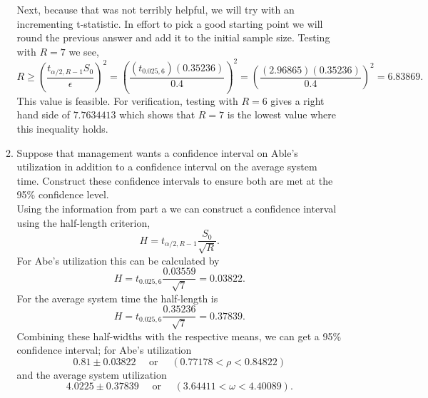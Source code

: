 \documentclass[12pt]{amsart}
\begin{document}
\begin{enumerate}[1.]
\begin{enumerate}
	Next, because that was not terribly helpful, we will try with an incrementing t-statistic. 
	In effort to pick a good starting point we will round the previous answer and add it to the initial sample size.
	Testing with \(R=7\) we see,
	\[R \geq \left(\frac{t_{\alpha/2,R-1}S_0}{\epsilon}\right)^2 
	= \left(\frac{(t_{0.025,6})(0.35236)}{0.4}\right)^2
	= \left(\frac{(2.96865)(0.35236)}{0.4}\right)^2 = 6.83869.  \]
	This value is feasible. For verification, testing with \(R=6\) gives a right hand side of \(7.7634413\)
	which shows that \(R=7\) is the lowest value where this inequality holds. \\
	
	\item Suppose that management wants a confidence interval on Able’s utilization in addition to a
	confidence interval on the average system time. Construct these confidence intervals to
	ensure both are met at the 95\% confidence level. \\
	
	Using the information from part a we can construct a confidence interval using the half-length criterion,
	\[H = t_{\alpha/2,R-1}\frac{S_0}{\sqrt R}.\]
	For Abe's utilization this can be calculated by
	\[H = t_{0.025,6}\frac{0.03559}{\sqrt 7} = 0.03822.\]
	For the average system time the half-length is
	\[H = t_{0.025,6}\frac{0.35236}{\sqrt 7} = 0.37839.\]
	Combining these half-widths with the respective means, we can get a 95\% confidence interval;
	for Abe's utilization
	\[0.81 \pm 0.03822 \quad\text{ or }\quad (0.77178<\rho<0.84822)\]
	and the average system utilization
	\[4.0225 \pm 0.37839 \quad\text{ or }\quad (3.64411<\omega<4.40089) .\]
	
	
\end{enumerate}
\end{enumerate}
\end{document}
